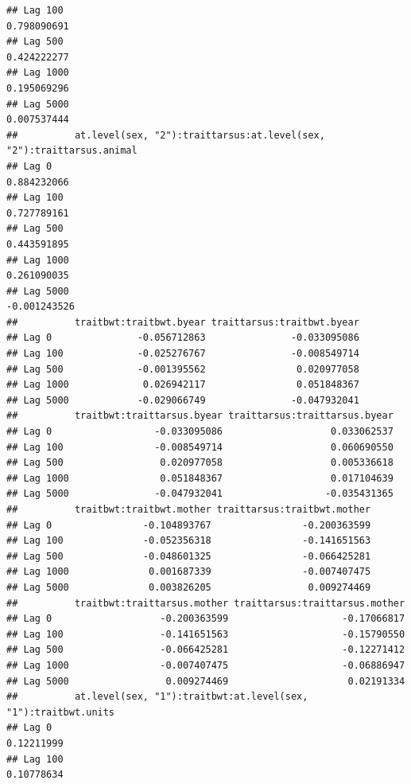 \documentclass[
  12pt,
]{book}
\begin{document}
\begin{verbatim}
## Lag 100                                                        0.798090691
## Lag 500                                                        0.424222277
## Lag 1000                                                       0.195069296
## Lag 5000                                                       0.007537444
##          at.level(sex, "2"):traittarsus:at.level(sex, "2"):traittarsus.animal
## Lag 0                                                             0.884232066
## Lag 100                                                           0.727789161
## Lag 500                                                           0.443591895
## Lag 1000                                                          0.261090035
## Lag 5000                                                         -0.001243526
##          traitbwt:traitbwt.byear traittarsus:traitbwt.byear
## Lag 0               -0.056712863               -0.033095086
## Lag 100             -0.025276767               -0.008549714
## Lag 500             -0.001395562                0.020977058
## Lag 1000             0.026942117                0.051848367
## Lag 5000            -0.029066749               -0.047932041
##          traitbwt:traittarsus.byear traittarsus:traittarsus.byear
## Lag 0                  -0.033095086                   0.033062537
## Lag 100                -0.008549714                   0.060690550
## Lag 500                 0.020977058                   0.005336618
## Lag 1000                0.051848367                   0.017104639
## Lag 5000               -0.047932041                  -0.035431365
##          traitbwt:traitbwt.mother traittarsus:traitbwt.mother
## Lag 0                -0.104893767                -0.200363599
## Lag 100              -0.052356318                -0.141651563
## Lag 500              -0.048601325                -0.066425281
## Lag 1000              0.001687339                -0.007407475
## Lag 5000              0.003826205                 0.009274469
##          traitbwt:traittarsus.mother traittarsus:traittarsus.mother
## Lag 0                   -0.200363599                    -0.17066817
## Lag 100                 -0.141651563                    -0.15790550
## Lag 500                 -0.066425281                    -0.12271412
## Lag 1000                -0.007407475                    -0.06886947
## Lag 5000                 0.009274469                     0.02191334
##          at.level(sex, "1"):traitbwt:at.level(sex, "1"):traitbwt.units
## Lag 0                                                       0.12211999
## Lag 100                                                     0.10778634

\end{verbatim}
\end{document}
